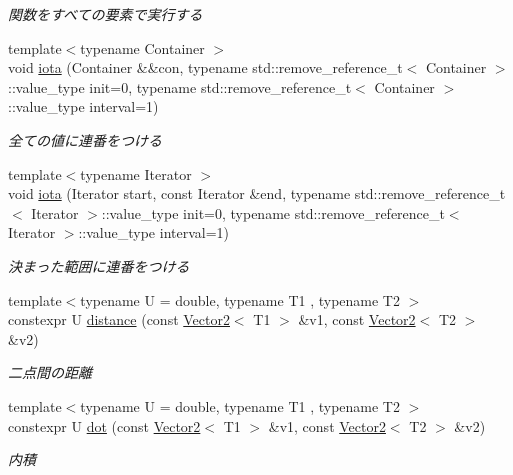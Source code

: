 \begin{DoxyCompactItemize}
\begin{DoxyCompactList}\small\item\em 関数をすべての要素で実行する \end{DoxyCompactList}\item 
{\footnotesize template$<$typename Container $>$ }\\void \mbox{\hyperlink{namespacesaki_ae2d32321776d936bd523e70b82f9236c}{iota}} (Container \&\&con, typename std\+::remove\+\_\+reference\+\_\+t$<$ Container $>$\+::value\+\_\+type init=0, typename std\+::remove\+\_\+reference\+\_\+t$<$ Container $>$\+::value\+\_\+type interval=1)
\begin{DoxyCompactList}\small\item\em 全ての値に連番をつける \end{DoxyCompactList}\item 
{\footnotesize template$<$typename Iterator $>$ }\\void \mbox{\hyperlink{namespacesaki_a45760a54288991b21995d0b2338ea134}{iota}} (Iterator start, const Iterator \&end, typename std\+::remove\+\_\+reference\+\_\+t$<$ Iterator $>$\+::value\+\_\+type init=0, typename std\+::remove\+\_\+reference\+\_\+t$<$ Iterator $>$\+::value\+\_\+type interval=1)
\begin{DoxyCompactList}\small\item\em 決まった範囲に連番をつける \end{DoxyCompactList}\item 
{\footnotesize template$<$typename U  = double, typename T1 , typename T2 $>$ }\\constexpr U \mbox{\hyperlink{namespacesaki_a37a9f74395755bc30cad0d612369e322}{distance}} (const \mbox{\hyperlink{classsaki_1_1_vector2}{Vector2}}$<$ T1 $>$ \&v1, const \mbox{\hyperlink{classsaki_1_1_vector2}{Vector2}}$<$ T2 $>$ \&v2)
\begin{DoxyCompactList}\small\item\em 二点間の距離 \end{DoxyCompactList}\item 
{\footnotesize template$<$typename U  = double, typename T1 , typename T2 $>$ }\\constexpr U \mbox{\hyperlink{namespacesaki_a724d6c36d761314950d3ec8be6a4f4ab}{dot}} (const \mbox{\hyperlink{classsaki_1_1_vector2}{Vector2}}$<$ T1 $>$ \&v1, const \mbox{\hyperlink{classsaki_1_1_vector2}{Vector2}}$<$ T2 $>$ \&v2)
\begin{DoxyCompactList}\small\item\em 内積 \end{DoxyCompactList}\item 

\end{DoxyCompactItemize}
